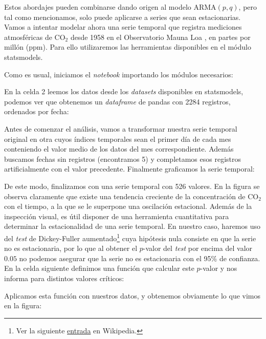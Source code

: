 Estos abordajes pueden combinarse dando origen al modelo ARMA$(p, q)$, pero tal como mencionamos, solo puede aplicarse a series que sean estacionarias. Vamos a intentar modelar ahora una serie temporal que registra mediciones atmosféricas de CO$_2$ desde 1958 en el Observatorio Mauna Loa \cite{keeling2005}, en partes por millón (ppm). Para ello utilizaremos las herramientas disponibles en el módulo statsmodels.

Como es usual, iniciamos el \textit{notebook} importando los módulos necesarios:

En la celda 2 leemos los datos desde los \textit{datasets} disponibles en statsmodels, podemos ver que obtenemos un \textit{dataframe} de pandas con 2284 registros, ordenados por fecha:

Antes de comenzar el análisis, vamos a transformar nuestra serie temporal original en otra cuyos índices temporales sean el primer día de cada mes conteniendo el valor medio de los datos del mes correspondiente. Además buscamos fechas sin registros (encontramos 5) y completamos esos registros artificialmente con el valor precedente. Finalmente graficamos la serie temporal:

De este modo, finalizamos con una serie temporal con 526 valores. En la figura se observa claramente que existe una tendencia creciente de la concentración de CO$_2$ con el tiempo, a la que se le superpone una oscilación estacional. Además de la inspección visual, es útil disponer de una herramienta cuantitativa para determinar la estacionalidad de una serie temporal. En nuestro caso, haremos uso del \textit{test} de Dickey-Fuller aumentado\footnote{Ver la siguiente \href{https://es.wikipedia.org/wiki/Prueba_de_Dickey-Fuller_aumentada}{entrada} en Wikipedia.} cuya hipótesis nula consiste en que la serie no es estacionaria, por lo que al obtener el $p$-valor del \textit{test} por encima del valor $0.05$ no podemos asegurar que la serie no es estacionaria con el 95\% de confianza. En la celda siguiente definimos una función que calcular este $p$-valor y nos informa para distintos valores críticos:

Aplicamos esta función con nuestros datos, y obtenemos obviamente lo que vimos en la figura:

